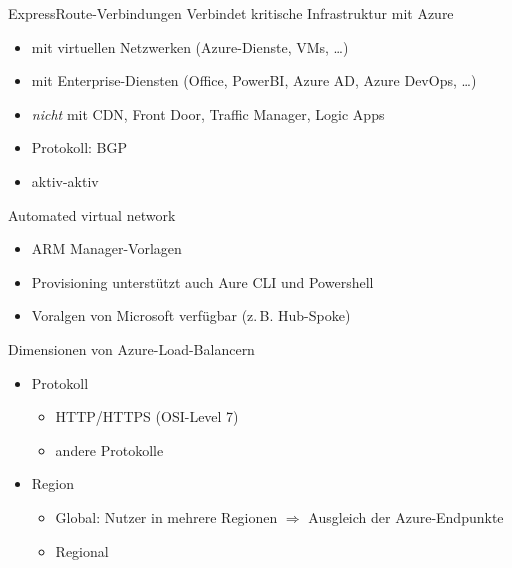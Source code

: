 \begin{flashcard}[]{ExpressRoute-Verbindungen}
  Verbindet kritische Infrastruktur mit Azure
  \begin{itemize}
    \item mit virtuellen Netzwerken (Azure-Dienste, VMs, \ldots)
    \item mit Enterprise-Diensten (Office, PowerBI, Azure AD, Azure DevOps, \ldots)
    \item \emph{nicht} mit CDN, Front Door, Traffic Manager, Logic Apps
    \item Protokoll: BGP
    \item aktiv-aktiv
  \end{itemize}
\end{flashcard}


\begin{flashcard}[]{Automated virtual network}
  \begin{itemize}
    \item ARM Manager-Vorlagen
    \item Provisioning unterstützt auch Aure CLI und Powershell
    \item Voralgen von Microsoft verfügbar (z.\,B. Hub-Spoke)
  \end{itemize}
\end{flashcard}


\begin{flashcard}[]{Dimensionen von Azure-Load-Balancern}
  \begin{itemize}
    \item Protokoll
      \begin{itemize}
        \item HTTP/HTTPS (OSI-Level 7)
        \item andere Protokolle
      \end{itemize}
    \item Region
      \begin{itemize}
        \item Global: Nutzer in mehrere Regionen\newline
          $\Rightarrow$ Ausgleich der Azure-Endpunkte
        \item Regional
      \end{itemize}
  \end{itemize}
\end{flashcard}


